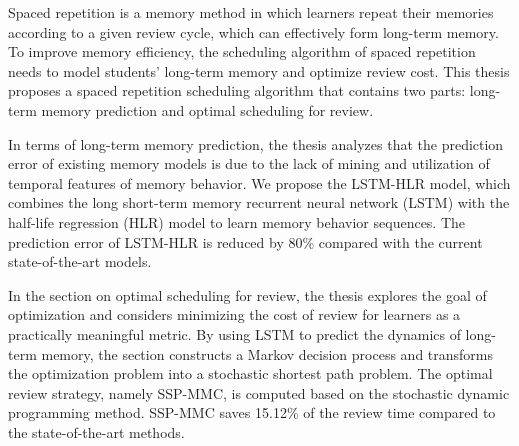 \begin{eabstract}
  Spaced repetition is a memory method in which learners repeat their memories according to a given review cycle, which can effectively form long-term memory. To improve memory efficiency, the scheduling algorithm of spaced repetition needs to model students' long-term memory and optimize review cost. This thesis proposes a spaced repetition scheduling algorithm that contains two parts: long-term memory prediction and optimal scheduling for review.

  In terms of long-term memory prediction, the thesis analyzes that the prediction error of existing memory models is due to the lack of mining and utilization of temporal features of memory behavior. We propose the LSTM-HLR model, which combines the long short-term memory recurrent neural network (LSTM) with the half-life regression (HLR) model to learn memory behavior sequences. The prediction error of LSTM-HLR is reduced by 80\% compared with the current state-of-the-art models.

  In the section on optimal scheduling for review, the thesis explores the goal of optimization and considers minimizing the cost of review for learners as a practically meaningful metric. By using LSTM to predict the dynamics of long-term memory, the section constructs a Markov decision process and transforms the optimization problem into a stochastic shortest path problem. The optimal review strategy, namely SSP-MMC, is computed based on the stochastic dynamic programming method. SSP-MMC saves 15.12\% of the review time compared to the state-of-the-art methods.


\end{eabstract}
